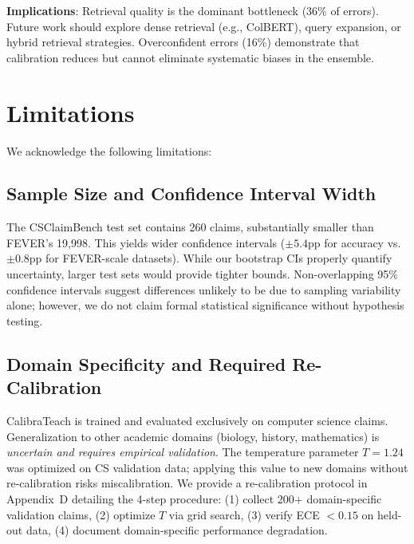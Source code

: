 \documentclass[journal]{IEEEtran}
\begin{document}
\textbf{Implications}: Retrieval quality is the dominant bottleneck (36\% of errors). Future work should explore dense retrieval (e.g., ColBERT), query expansion, or hybrid retrieval strategies. Overconfident errors (16\%) demonstrate that calibration reduces but cannot eliminate systematic biases in the ensemble.


\section{Limitations}

We acknowledge the following limitations:

\subsection{Sample Size and Confidence Interval Width}

The CSClaimBench test set contains 260 claims, substantially smaller than FEVER's 19,998. This yields wider confidence intervals ($\pm5.4$pp for accuracy vs. $\pm0.8$pp for FEVER-scale datasets). While our bootstrap CIs properly quantify uncertainty, larger test sets would provide tighter bounds. Non-overlapping 95\% confidence intervals suggest differences unlikely to be due to sampling variability alone; however, we do not claim formal statistical significance without hypothesis testing.

\subsection{Domain Specificity and Required Re-Calibration}

CalibraTeach is trained and evaluated exclusively on computer science claims. Generalization to other academic domains (biology, history, mathematics) is \textit{uncertain and requires empirical validation}. The temperature parameter $T=1.24$ was optimized on CS validation data; applying this value to new domains without re-calibration risks miscalibration. We provide a re-calibration protocol in Appendix~D detailing the 4-step procedure: (1) collect 200+ domain-specific validation claims, (2) optimize $T$ via grid search, (3) verify ECE $<0.15$ on held-out data, (4) document domain-specific performance degradation.
\end{document}
